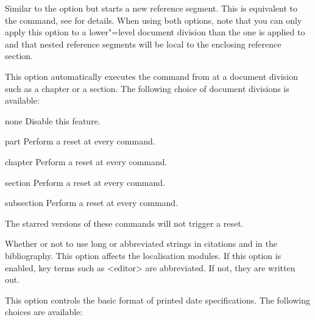 \documentclass{ltxdockit}[2011/03/25]
\begin{document}
\begin{optionlist}

Similar to the  option but starts a new reference segment. This is equivalent to the  command, see  for details. When using both options, note that you can only apply this option to a lower"=level document division than the one  is applied to and that nested reference segments will be local to the enclosing reference section.


This option automatically executes the  command from  at a document division such as a chapter or a section. The following choice of document divisions is available:

\begin{valuelist}
\item[none] Disable this feature.
\item[part] Perform a reset at every  command.
\item[chapter] Perform a reset at every  command.
\item[section] Perform a reset at every  command.
\item[subsection] Perform a reset at every  command.
\end{valuelist}
%
The starred versions of these commands will not trigger a reset.


Whether or not to use long or abbreviated strings in citations and in the bibliography. This option affects the localisation modules. If this option is enabled, key terms such as <editor> are abbreviated. If not, they are written out.


This option controls the basic format of printed date specifications. The following choices are available:


\end{optionlist}
\end{document}
